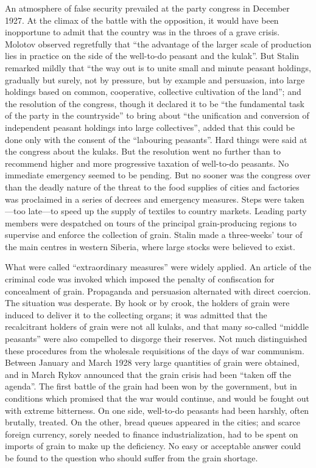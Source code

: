 An atmosphere of false security prevailed at the party congress in December 1927. At the climax of the battle with the opposition, it would have been inopportune to admit that the country was in the throes of a grave crisis. Molotov observed regretfully that ``the advantage of the larger scale of production lies in practice on the side of the well-to-do peasant and the kulak''. But Stalin remarked mildly that ``the way out is to unite small and minute peasant holdings, gradually but surely, not by pressure, but by example and persuasion, into large holdings based on common, cooperative, collective cultivation of the land''; and the resolution of the congress, though it declared it to be ``the fundamental task of the party in the countryside'' to bring about ``the unification and conversion of independent peasant holdings into large collectives'', added that this could be done only with the consent of the ``labouring peasants''. Hard things were said at the congress about the kulaks. But the resolution went no further than to recommend higher and more progressive taxation of well-to-do peasants. No immediate emergency seemed to be pending. But no sooner was the congress over than the deadly nature of the threat to the food supplies of cities and factories was proclaimed in a series of decrees and emergency measures. Steps were taken---too late---to speed up the supply of textiles to country markets. Leading party members were despatched on tours of the principal grain-producing regions to supervise and enforce the collection of grain. Stalin made a three-weeks' tour of the main centres in western Siberia, where large stocks were believed to exist. 

What were called ``extraordinary measures'' were widely applied. An article of the criminal code was invoked which imposed the penalty of confiscation for concealment of grain. Propaganda and persuasion alternated with direct coercion. The situation was desperate. By hook or by crook, the holders of grain were induced to deliver it to the collecting organs; it was admitted that the recalcitrant holders of grain were not all kulaks, and that many so-called ``middle peasants'' were also compelled to disgorge their reserves. Not much distinguished these procedures from the wholesale requisitions of the days of war communism. Between January and March 1928 very large quantities of grain were obtained, and in March Rykov announced that the grain crisis had been ``taken off the agenda''. The first battle of the grain had been won by the government, but in conditions which promised that the war would continue, and would be fought out with extreme bitterness. On one side, well-to-do peasants had been harshly, often brutally, treated. On the other, bread queues appeared in the cities; and scarce foreign currency, sorely needed to finance industrialization, had to be spent on imports of grain to make up the deficiency. No easy or acceptable answer could be found to the question who should suffer from the grain shortage. 

